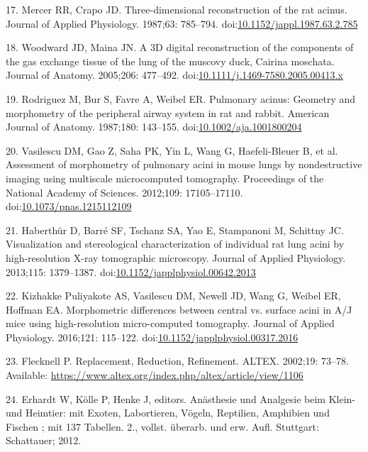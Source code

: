 \documentclass[
  american,
]{article}
\newenvironment{cslreferences}%
  {}%
  {\par}
\begin{document}
\begin{cslreferences}
\leavevmode\hypertarget{ref-c3aIB7f9}{}%
17. Mercer RR, Crapo JD. Three-dimensional reconstruction of the rat acinus. Journal of Applied Physiology. 1987;63: 785--794. doi:\href{https://doi.org/10.1152/jappl.1987.63.2.785}{10.1152/jappl.1987.63.2.785}

\leavevmode\hypertarget{ref-CPhMy3Ie}{}%
18. Woodward JD, Maina JN. A 3D digital reconstruction of the components of the gas exchange tissue of the lung of the muscovy duck, Cairina moschata. Journal of Anatomy. 2005;206: 477--492. doi:\href{https://doi.org/10.1111/j.1469-7580.2005.00413.x}{10.1111/j.1469-7580.2005.00413.x}

\leavevmode\hypertarget{ref-1GJECnKBu}{}%
19. Rodriguez M, Bur S, Favre A, Weibel ER. Pulmonary acinus: Geometry and morphometry of the peripheral airway system in rat and rabbit. American Journal of Anatomy. 1987;180: 143--155. doi:\href{https://doi.org/10.1002/aja.1001800204}{10.1002/aja.1001800204}

\leavevmode\hypertarget{ref-C6OaY84D}{}%
20. Vasilescu DM, Gao Z, Saha PK, Yin L, Wang G, Haefeli-Bleuer B, et al. Assessment of morphometry of pulmonary acini in mouse lungs by nondestructive imaging using multiscale microcomputed tomography. Proceedings of the National Academy of Sciences. 2012;109: 17105--17110. doi:\href{https://doi.org/10.1073/pnas.1215112109}{10.1073/pnas.1215112109}

\leavevmode\hypertarget{ref-7YLeeyu}{}%
21. Haberthür D, Barré SF, Tschanz SA, Yao E, Stampanoni M, Schittny JC. Visualization and stereological characterization of individual rat lung acini by high-resolution X-ray tomographic microscopy. Journal of Applied Physiology. 2013;115: 1379--1387. doi:\href{https://doi.org/10.1152/japplphysiol.00642.2013}{10.1152/japplphysiol.00642.2013}

\leavevmode\hypertarget{ref-RGBeCf8v}{}%
22. Kizhakke Puliyakote AS, Vasilescu DM, Newell JD, Wang G, Weibel ER, Hoffman EA. Morphometric differences between central vs. surface acini in A/J mice using high-resolution micro-computed tomography. Journal of Applied Physiology. 2016;121: 115--122. doi:\href{https://doi.org/10.1152/japplphysiol.00317.2016}{10.1152/japplphysiol.00317.2016}

\leavevmode\hypertarget{ref-199ALtdJt}{}%
23. Flecknell P. Replacement, Reduction, Refinement. ALTEX. 2002;19: 73--78. Available: \url{https://www.altex.org/index.php/altex/article/view/1106}

\leavevmode\hypertarget{ref-IdRLVLjl}{}%
24. Erhardt W, Kölle P, Henke J, editors. Anästhesie und Analgesie beim Klein- und Heimtier: mit Exoten, Labortieren, Vögeln, Reptilien, Amphibien und Fischen ; mit 137 Tabellen. 2., vollst. überarb. und erw. Aufl. Stuttgart: Schattauer; 2012.


\end{cslreferences}
\end{document}
